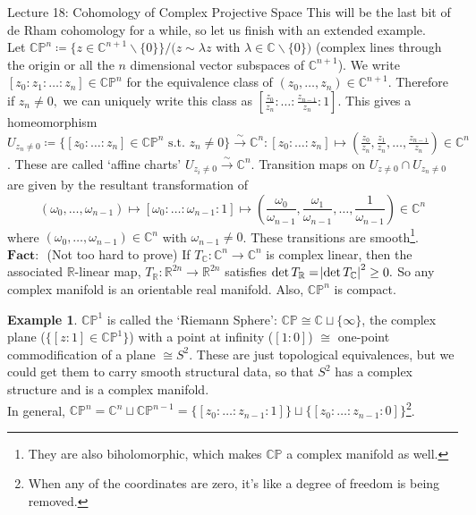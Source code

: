 \documentclass[10pt]{article}
\theoremstyle{plain}
\theoremstyle{definition}
\newtheorem{exmp}[thm]{Example} %
\newcommand{\st}{\text{ s.t. }}
\newcommand{\Fact}{\textbf{Fact: }}
\newcommand{\Real}{\mathbb{R}}
\newcommand{\CProj}{\mathbb{CP}}
\newcommand{\remzero}{\backslash \{0\}}
\begin{document}
\begin{section}{Lecture 18: Cohomology of Complex Projective Space}
This will be the last bit of de Rham cohomology for a while, so let us finish with an extended example.\\
Let $\CProj^n \coloneqq \{z\in\mathbb{C}^{n+1} \remzero\} / (z\sim \lambda z $ with $\lambda \in \mathbb{C} \remzero)$ (complex lines through the origin or all the $n$ dimensional vector subspaces of $\mathbb{C}^{n+1}$). We write $[z_0: z_1: \ldots : z_n] \in \CProj^n$ for the equivalence class of $(z_0,\ldots,z_n) \in \mathbb{C}^{n+1}$. Therefore if $z_n\neq 0,$ we can uniquely write this class as $[\frac{z_0}{z_n}: \ldots : \frac{z_{n-1}}{z_n} : 1 ].$ This gives a homeomorphism $U_{z_n\neq 0} \coloneqq \{ [ z_0 : \ldots : z_n] \in \CProj ^n \st z_n \neq 0\} \xrightarrow[]{\sim} \mathbb{C}^n: [z_0 : \ldots: z_n ] \mapsto (\frac{z_0}{z_n},\frac{z_1}{z_n},\ldots,\frac{z_{n-1}}{z_n}) \in \mathbb{C}^n$. These are called `affine charts' $U_{z_i\neq0} \xrightarrow[]{\sim} \mathbb{C}^n$. Transition maps on $U_{z\neq 0} \cap U_{z_n \neq 0} $ are given by the resultant transformation of 
$$(\omega_0,\ldots,\omega_{n-1}) \mapsto [\omega_0:\ldots : \omega_{n-1} : 1 ] \mapsto \left(\frac{\omega_0}{\omega_{n-1}}, \frac{\omega_1}{\omega_{n-1}},\ldots,\frac{1}{\omega_{n-1}}\right) \in \mathbb{C}^n$$
where $(\omega_0 , \ldots, \omega_{n-1}) \in \mathbb{C}^n$ with $\omega_{n-1}\neq 0$. These transitions are smooth\footnote{They are also biholomorphic, which makes $\CProj$ a complex manifold as well.}.\\
$\Fact$ (Not too hard to prove) If $T_\mathbb{C} : \mathbb{C}^n \to \mathbb{C}^n$ is complex linear, then the associated $\Real$-linear map, $T_\Real : \Real^{2n} \to \Real^{2n}$ satisfies $\det T_\Real = \abs{\det T_\mathbb{C}}^2 \geq 0.$ So any complex manifold is an orientable real manifold. Also, $\CProj^n$ is compact.
\begin{exmp}
$\CProj^1$ is called the `Riemann Sphere': $\CProj \cong \mathbb{C} \sqcup \{\infty\}$, the complex plane ($\{[z:1]\in\CProj^1\}$) with a point at infinity ($[1:0]$) $\cong$ one-point commodification of a plane $\cong S^2$. These are just topological equivalences, but we could get them to carry smooth structural data, so that $S^2$ has a complex structure and is a complex manifold. \\
In general, $\CProj^n = \mathbb{C}^n \sqcup \CProj^{n-1} = \{[z_0:\ldots:z_{n-1}:1]\} \sqcup \{[z_0:\ldots:z_{n-1}:0]\}$\footnote{When any of the coordinates are zero, it's like a degree of freedom is being removed.}.
\end{exmp}


\end{section}
\end{document}
